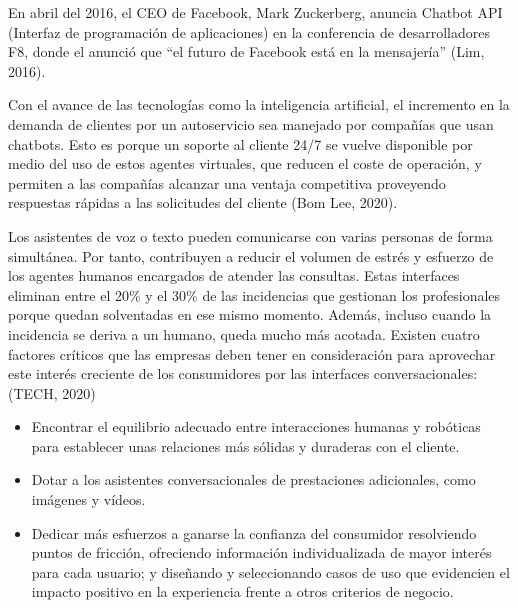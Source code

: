 \documentclass[letter, openright, 12pt]{book}
\begin{document}
\par 
En abril del 2016, el CEO de Facebook, Mark Zuckerberg, anuncia Chatbot API (Interfaz de programación de aplicaciones) en la conferencia de desarrolladores F8, donde el anunció que “el futuro de Facebook está en la mensajería” (Lim, 2016). 
\par 
Con el avance de las tecnologías como la inteligencia artificial, el incremento en la demanda de clientes por un autoservicio sea manejado por compañías que usan chatbots. Esto es porque un soporte al cliente 24/7 se vuelve disponible por medio del uso de estos agentes virtuales, que reducen el coste de operación, y permiten a las compañías alcanzar una ventaja competitiva proveyendo respuestas rápidas a las solicitudes del cliente (Bom Lee, 2020). 
\par 
Los asistentes de voz o texto pueden comunicarse con varias personas de forma simultánea. Por tanto, contribuyen a reducir el volumen de estrés y esfuerzo de los agentes humanos encargados de atender las consultas. Estas interfaces eliminan entre el 20\% y el 30\% de las incidencias que gestionan los profesionales porque quedan solventadas en ese mismo momento. Además, incluso cuando la incidencia se deriva a un humano, queda mucho más acotada. Existen cuatro factores críticos que las empresas deben tener en consideración para aprovechar este interés creciente de los consumidores por las interfaces conversacionales: (TECH, 2020)  
\begin{itemize}
\item Encontrar el equilibrio adecuado entre interacciones humanas y robóticas para establecer unas relaciones más sólidas y duraderas con el cliente.
\item Dotar a los asistentes conversacionales de prestaciones adicionales, como imágenes y vídeos.
\item Dedicar más esfuerzos a ganarse la confianza del consumidor resolviendo puntos de fricción, ofreciendo información individualizada de mayor interés para cada usuario; y diseñando y seleccionando casos de uso que evidencien el impacto positivo en la experiencia frente a otros criterios de negocio.
\end{itemize}
\end{document}
